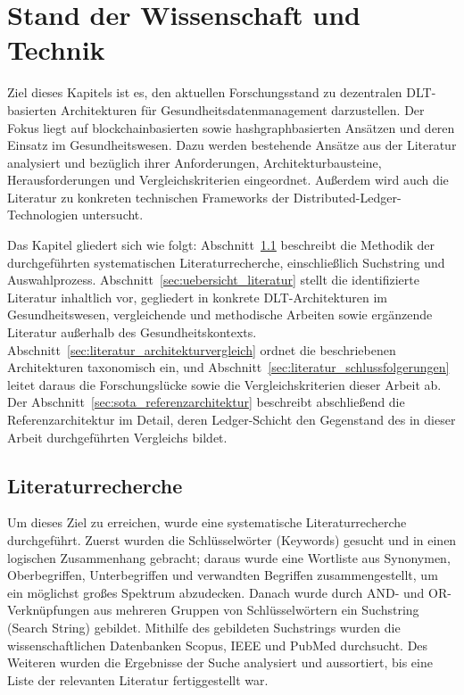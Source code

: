 \chapter{Stand der Wissenschaft und Technik}
\label{cha:state_of_the_art}

Ziel dieses Kapitels ist es, den aktuellen Forschungsstand zu dezentralen DLT-basierten Architekturen für Gesundheitsdatenmanagement darzustellen. Der Fokus liegt auf blockchainbasierten sowie hashgraphbasierten Ansätzen und deren Einsatz im Gesundheitswesen. Dazu werden bestehende Ansätze aus der Literatur analysiert und bezüglich ihrer Anforderungen, Architekturbausteine, Herausforderungen und Vergleichskriterien eingeordnet. Außerdem wird auch die Literatur zu konkreten technischen Frameworks der Distributed-Ledger-Technologien untersucht.

Das Kapitel gliedert sich wie folgt: Abschnitt~\ref{sec:literaturrecherche} beschreibt die Methodik der durchgeführten systematischen Literaturrecherche, einschließlich Suchstring und Auswahlprozess. Abschnitt~\ref{sec:uebersicht_literatur} stellt die identifizierte Literatur inhaltlich vor, gegliedert in konkrete DLT-Architekturen im Gesundheitswesen, vergleichende und methodische Arbeiten sowie ergänzende Literatur außerhalb des Gesundheitskontexts. Abschnitt~\ref{sec:literatur_architekturvergleich} ordnet die beschriebenen Architekturen taxonomisch ein, und Abschnitt~\ref{sec:literatur_schlussfolgerungen} leitet daraus die Forschungslücke sowie die Vergleichskriterien dieser Arbeit ab. Der Abschnitt~\ref{sec:sota_referenzarchitektur} beschreibt abschließend die Referenzarchitektur im Detail, deren Ledger-Schicht den Gegenstand des in dieser Arbeit durchgeführten Vergleichs bildet.


\section{Literaturrecherche}
\label{sec:literaturrecherche}
Um dieses Ziel zu erreichen, wurde eine systematische Literaturrecherche durchgeführt. Zuerst wurden die Schlüsselwörter (Keywords) gesucht und in einen logischen Zusammenhang gebracht; daraus wurde eine Wortliste aus Synonymen, Oberbegriffen, Unterbegriffen und verwandten Begriffen zusammengestellt, um ein möglichst großes Spektrum abzudecken. Danach wurde durch AND- und OR-Verknüpfungen aus mehreren Gruppen von Schlüsselwörtern ein Suchstring (Search String) gebildet. Mithilfe des gebildeten Suchstrings wurden die wissenschaftlichen Datenbanken Scopus, IEEE und PubMed durchsucht. Des Weiteren wurden die Ergebnisse der Suche analysiert und aussortiert, bis eine Liste der relevanten Literatur fertiggestellt war.


